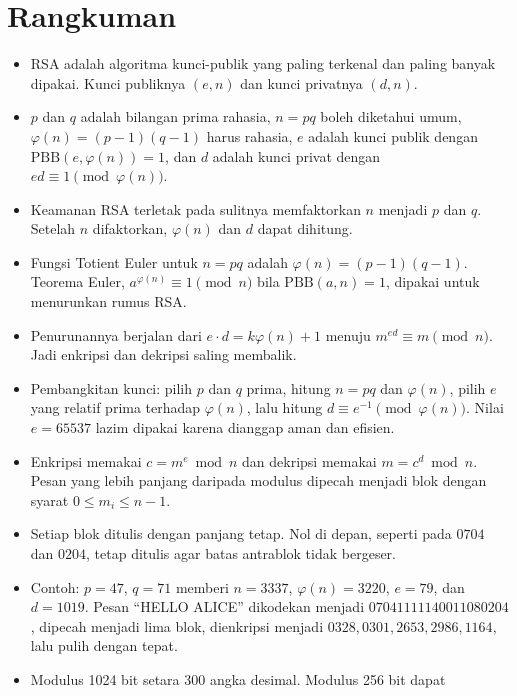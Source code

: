 \section{Rangkuman}
\begin{itemize}
    \item RSA adalah algoritma kunci-publik yang paling terkenal dan paling
          banyak dipakai. Kunci publiknya $(e, n)$ dan kunci privatnya
          $(d, n)$.
    \item $p$ dan $q$ adalah bilangan prima rahasia, $n = pq$ boleh diketahui
          umum, $\varphi(n) = (p-1)(q-1)$ harus rahasia, $e$ adalah kunci
          publik dengan $\text{PBB}(e, \varphi(n)) = 1$, dan $d$ adalah kunci
          privat dengan $ed \equiv 1 \pmod{\varphi(n)}$.
    \item Keamanan RSA terletak pada sulitnya memfaktorkan $n$ menjadi $p$ dan
          $q$. Setelah $n$ difaktorkan, $\varphi(n)$ dan $d$ dapat dihitung.
    \item Fungsi Totient Euler untuk $n = pq$ adalah $\varphi(n) = (p-1)(q-1)$.
          Teorema Euler, $a^{\varphi(n)} \equiv 1 \pmod n$ bila
          $\text{PBB}(a,n)=1$, dipakai untuk menurunkan rumus RSA.
    \item Penurunannya berjalan dari $e \cdot d = k\varphi(n) + 1$ menuju
          $m^{ed} \equiv m \pmod n$. Jadi enkripsi dan dekripsi saling
          membalik.
    \item Pembangkitan kunci: pilih $p$ dan $q$ prima, hitung $n = pq$ dan
          $\varphi(n)$, pilih $e$ yang relatif prima terhadap $\varphi(n)$,
          lalu hitung $d \equiv e^{-1} \pmod{\varphi(n)}$. Nilai $e = 65537$
          lazim dipakai karena dianggap aman dan efisien.
    \item Enkripsi memakai $c = m^e \bmod n$ dan dekripsi memakai
          $m = c^d \bmod n$. Pesan yang lebih panjang daripada modulus dipecah
          menjadi blok dengan syarat $0 \le m_i \le n-1$.
    \item Setiap blok ditulis dengan panjang tetap. Nol di depan, seperti pada
          $0704$ dan $0204$, tetap ditulis agar batas antrablok tidak
          bergeser.
    \item Contoh: $p=47$, $q=71$ memberi $n=3337$, $\varphi(n)=3220$,
          $e=79$, dan $d=1019$. Pesan ``HELLO ALICE'' dikodekan menjadi
          $07041111140011080204$, dipecah menjadi lima blok, dienkripsi
          menjadi $0328, 0301, 2653, 2986, 1164$, lalu pulih dengan tepat.
    \item Modulus 1024 bit setara 300 angka desimal. Modulus 256 bit dapat

\end{itemize}
